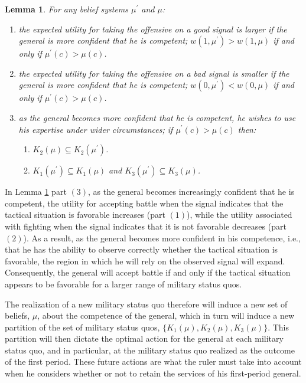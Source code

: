 \documentclass[11pt,]{article}
\newtheorem{lemma}[]{Lemma}
\begin{document}
\begin{lemma}For any belief systems $\mu^{\prime}$ and $\mu$:
\begin{enumerate}
\item the expected utility for taking the offensive on a good signal is larger if the general is more confident that he is competent; $w(1,\mu^{\prime})> w(1,\mu)$ if and only if $\mu^{\prime}(c)>\mu(c)$.

\item the expected utility for taking the offensive on a bad signal is smaller if the general is more confident that he is competent; $w(0,\mu^{\prime})< w(0,\mu)$ if and only if $\mu^{\prime}(c)>\mu(c)$.

\item as the general becomes more confident that he is competent, he wishes to use his expertise under wider circumstances; if $\mu^{\prime}(c)>\mu(c)$ then:
\begin{enumerate}
\item $K_2(\mu)\subseteq K_2(\mu^{\prime})$.
\item $K_1(\mu^{\prime})\subseteq K_1(\mu)$ and $K_3(\mu^{\prime})\subseteq K_3(\mu)$.
\end{enumerate}
\end{enumerate}
\label{expected utility and competence}
\end{lemma}\noindent In Lemma \ref{expected utility and competence} part $(3)$, as the general becomes increasingly confident that he is competent, the utility for accepting battle when the signal indicates that the tactical situation is favorable increases (part $(1)$), while the utility associated with fighting when the signal indicates that it is not favorable decreases (part $(2)$).  As a result, as the general becomes more confident in his competence, i.e., that he has the ability to observe correctly whether the tactical situation is favorable, the region in which he will rely on the observed signal will expand. Consequently, the general will accept battle if and only if the tactical situation appears to be favorable for a larger range of military status quos.

The realization of a new military status quo therefore will induce a new set of beliefs, $\mu$, about the competence of the general, which in turn will induce a new partition of the set of military status quos, $\{K_1(\mu),K_2(\mu),K_3(\mu)\}$.  This partition will then dictate the optimal action for the general at each military status quo, and in particular, at the military status quo realized as the outcome of the first period.  These future actions are what the ruler must take into account when he considers whether or not to retain the services of his first-period general.
\end{document}
